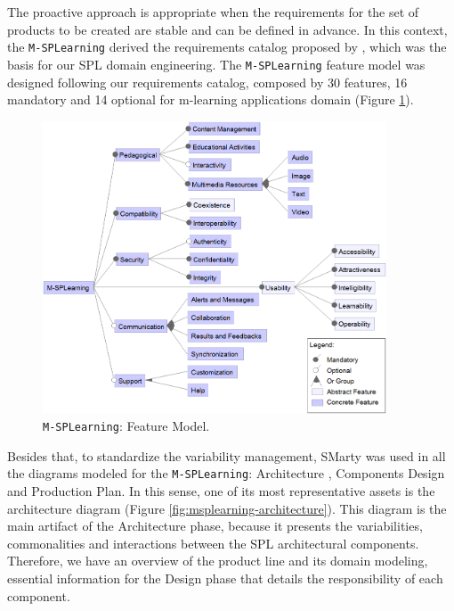 
The proactive approach is appropriate when the requirements for the set of products to be created are stable and can be defined in advance. In this context, the \texttt{M-SPLear\allowbreak ning} derived the requirements catalog proposed by \cite{filho13}, which was the basis for our SPL domain engineering. The \texttt{M-SPLear\allowbreak ning} feature model was designed following our requirements catalog, composed by 30 features, 16 mandatory and 14 optional for m-learning applications domain (Figure \ref{fig:msplearning-fm}).

\begin{figure}[!htbp]
\centering
\includegraphics[width=0.91\textwidth]{MSPLFeatureModel.png}
\centering
\caption{\texttt{M-SPLear\allowbreak ning}: Feature Model.}
\label{fig:msplearning-fm}
\end{figure}

Besides that, to standardize the variability management, SMarty was used in all the diagrams modeled for the \texttt{M-SPLear\allowbreak ning}: Architecture , Components Design and Production Plan. In this sense, one of its most representative assets is the architecture diagram (Figure \ref{fig:msplearning-architecture}). This diagram is the main artifact of the Architecture phase, because it presents the variabilities, commonalities and interactions between the SPL architectural components. Therefore, we have an overview of the product line and its domain modeling, essential information for the Design phase that details the responsibility of each component.

